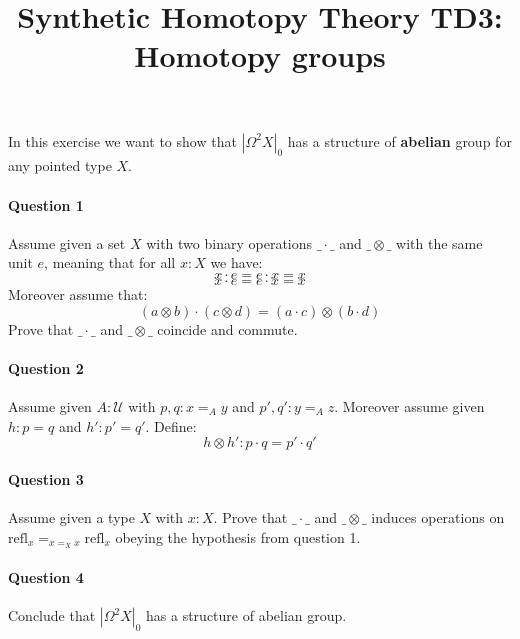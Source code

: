 \documentclass{article}[6pt]%
\title{Synthetic Homotopy Theory TD3: Homotopy groups}
\newcommand{\U}{{\mathcal U}}
\newcommand{\refl}{\mathrm{refl}}
\begin{document}
\maketitle



\begin{Exercise}[title={Eckmann-Hilton argument}]
In this exercise we want to show that $|\Omega^2 X|_0$ has a structure of {\bf abelian} group for any pointed type $X$.%

\paragraph{Question 1} Assume given a set $X$ with two binary operations $\_\cdot\_$ and $\_\otimes\_$ with the same unit $e$, meaning that for all $x:X$ we have: 
\[x\cdot e = e\cdot x = x\]
\[x\cdot e = e\cdot x = x\]
Moreover assume that:
\[(a\otimes b)\cdot(c\otimes d) = (a\cdot c)\otimes(b\cdot d)\]
Prove that $\_\cdot\_$ and $\_\otimes\_$ coincide and commute.


\paragraph{Question 2} Assume given $A:\U$ with $p,q : x=_Ay$ and $p',q':y=_Az$. Moreover assume given $h:p=q$ and $h':p'=q'$. Define:
\[h\otimes h': p\cdot q = p'\cdot q'\]

\paragraph{Question 3} Assume given a type $X$ with $x:X$. Prove that $\_\cdot\_$ and $\_\otimes\_$ induces operations on $\refl_x=_{x=_Xx}\refl_x$ obeying the hypothesis from question 1.

\paragraph{Question 4} Conclude that $|\Omega^2 X|_0$ has a structure of abelian group.

\end{Exercise}
\end{document}
